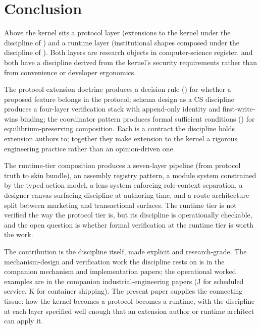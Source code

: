 \documentclass[11pt,a4paper]{article}
\theoremstyle{definition}
\theoremstyle{remark}
\begin{document}
\section{Conclusion}
\label{sec:conclusion}

Above the kernel sits a protocol layer (extensions to the kernel
under the discipline of )
and a runtime layer (institutional shapes composed under the
discipline of ). Both layers are research objects
in computer-science register, and both have a discipline derived
from the kernel's security requirements rather than from convenience
or developer ergonomics.

The protocol-extension doctrine produces a decision rule
() for whether a proposed feature belongs
in the protocol; schema design as a CS discipline produces a
four-layer verification stack with append-only identity and
first-write-wins binding; the coordinator pattern produces formal
sufficient conditions () for
equilibrium-preserving composition. Each is a contract the
discipline holds extension authors to; together they make extension
to the kernel a rigorous engineering practice rather than an
opinion-driven one.

The runtime-tier composition produces a seven-layer pipeline (from
protocol truth to skin bundle), an assembly registry pattern, a
module system constrained by the typed action model, a lens system
enforcing role-context separation, a designer canvas surfacing
discipline at authoring time, and a route-architecture split between
marketing and transactional surfaces. The runtime tier is not
verified the way the protocol tier is, but its discipline is
operationally checkable, and the open question is whether formal
verification at the runtime tier is worth the work.

The contribution is the discipline itself, made explicit and
research-grade. The mechanism-design and verification work the
discipline rests on is in the companion mechanism and implementation
papers; the operational worked examples are in the companion
industrial-engineering papers (J for scheduled service, K for
container shipping). The present paper supplies the connecting tissue:
how the kernel becomes a protocol becomes a runtime, with the
discipline at each layer specified well enough that an extension
author or runtime architect can apply it.
\end{document}
